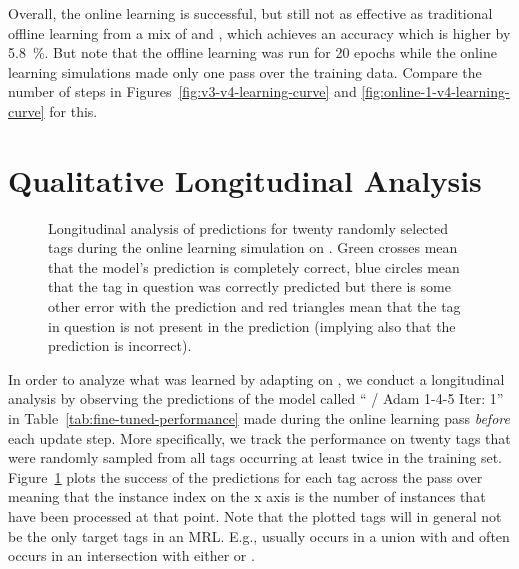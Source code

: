 Overall, the online learning is successful, but still not as effective as
traditional offline learning from a mix of \nlmthree{} and \nlmfour{}, which
achieves an accuracy which is higher by \SI{5.8}{\%}. But note that the offline
learning was run for \num{20} epochs while the online learning simulations made
only one pass over the training data. Compare the number of steps in
Figures~\ref{fig:v3-v4-learning-curve} and \ref{fig:online-1-v4-learning-curve}
for this.

\FloatBarrier
\section{Qualitative Longitudinal Analysis}

\begin{figure}[h]
  \centering
  \resizebox{\textwidth}{!}{}
  \caption[Longitudinal analysis]{Longitudinal analysis of predictions for
    twenty randomly selected tags during the online learning simulation on
    \nlmfour{}. \textcolor{mplGreen}{Green crosses} mean that the model’s
    prediction is completely correct, \textcolor{mplBlue}{blue circles} mean
    that the tag in question was correctly predicted but there is some other
    error with the prediction and \textcolor{mplRed}{red triangles} mean that
    the tag in question is not present in the prediction (implying also that the
    prediction is incorrect).}
  \label{fig:online-analysis}
\end{figure}

In order to analyze what was learned by adapting on \nlmfour{}, we conduct a
longitudinal analysis by observing the predictions of the model called
\enquote{\nlmthree{} \textrightarrow{} \nlmthree{}/\nlmfour{} Adam 1-4-5 Iter:
  1} in Table~\ref{tab:fine-tuned-performance} made during the online learning
pass \emph{before} each update step. More specifically, we track the performance
on twenty tags that were randomly sampled from all tags occurring at least twice
in the \nlmfour{} training set. Figure~\ref{fig:online-analysis} plots the
success of the predictions for each tag across the pass over \nlmfour{} meaning
that the instance index on the x axis is the number of instances that have been
processed at that point. Note that the plotted tags will in general not be the
only target tags in an MRL. E.g.,  usually occurs
in a union with  and  often occurs
in an intersection with either  or
.

